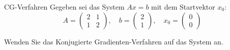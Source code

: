 \begin{example}{CG-Verfahren}
    Gegeben sei das System $Ax = b$ mit dem Startvektor $x_0$:
    \[
        A =
        \begin{pmatrix}
            2 & 1 \\
            1 & 2
        \end{pmatrix}
        , \quad
        b =
        \begin{pmatrix}
            2 \\ 1
        \end{pmatrix}
        , \quad
        x_0 =
        \begin{pmatrix}
            0 \\ 0
        \end{pmatrix}
    \]

    Wenden Sie das Konjugierte Gradienten-Verfahren auf das System an.

    \exampleseparator


\end{example}
